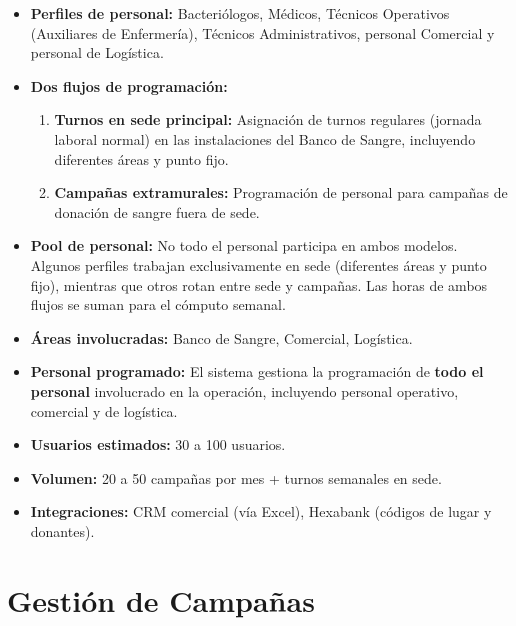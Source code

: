 \documentclass[10pt,a4paper]{article}
\begin{document}
\begin{itemize}[leftmargin=2em]
    \item \textbf{Perfiles de personal:} Bacteri\'{o}logos, M\'{e}dicos, T\'{e}cnicos Operativos (Auxiliares de Enfermer\'{i}a), T\'{e}cnicos Administrativos, personal Comercial y personal de Log\'{i}stica.
    \item \textbf{Dos flujos de programaci\'{o}n:}
    \begin{enumerate}
        \item \textbf{Turnos en sede principal:} Asignaci\'{o}n de turnos regulares (jornada laboral normal) en las instalaciones del Banco de Sangre, incluyendo diferentes \'{a}reas y punto fijo.
        \item \textbf{Campañas extramurales:} Programaci\'{o}n de personal para campañas de donaci\'{o}n de sangre fuera de sede.
    \end{enumerate}
    \item \textbf{Pool de personal:} No todo el personal participa en ambos modelos. Algunos perfiles trabajan exclusivamente en sede (diferentes \'{a}reas y punto fijo), mientras que otros rotan entre sede y campañas. Las horas de ambos flujos se suman para el c\'{o}mputo semanal.
    \item \textbf{\'{A}reas involucradas:} Banco de Sangre, Comercial, Log\'{i}stica.
    \item \textbf{Personal programado:} El sistema gestiona la programaci\'{o}n de \textbf{todo el personal} involucrado en la operaci\'{o}n, incluyendo personal operativo, comercial y de log\'{i}stica.
    \item \textbf{Usuarios estimados:} 30 a 100 usuarios.
    \item \textbf{Volumen:} 20 a 50 campañas por mes + turnos semanales en sede.
    \item \textbf{Integraciones:} CRM comercial (v\'{i}a Excel), Hexabank (c\'{o}digos de lugar y donantes).
\end{itemize}


\section{Gesti\'{o}n de Campañas}
\end{document}

